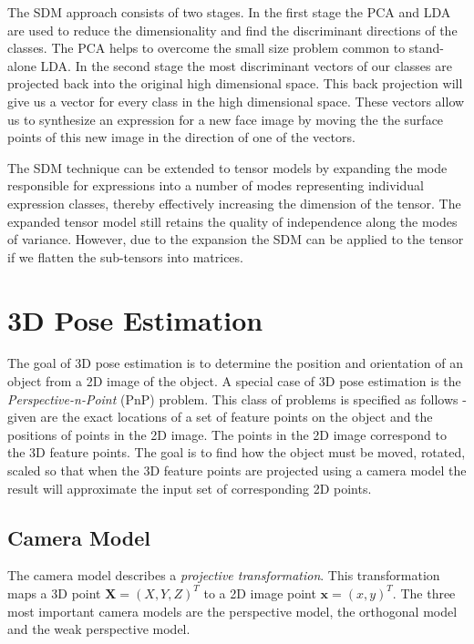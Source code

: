 \documentclass[11pt,a4paper]{report}
\begin{document}
The SDM approach consists of two stages. In the first stage the PCA
and LDA are used to reduce the dimensionality and find the discriminant
directions of the classes. The PCA helps to overcome the small size problem
common to stand-alone LDA. In the second stage the most discriminant vectors of
our classes are projected back into the original high dimensional space. This
back projection will give us a vector for every class in the high dimensional
space. These vectors allow us to synthesize an expression for a new face image by moving the the surface
points of this new image in the direction of one of the vectors. 

The SDM technique can be extended to tensor models by expanding the mode
responsible for expressions into a number of modes representing
individual expression classes, thereby effectively increasing the dimension of
the tensor. The expanded tensor model still retains the quality of independence
along the modes of variance. However, due to the expansion the SDM can be
applied to the tensor if we flatten the sub-tensors into matrices.

\section{3D Pose Estimation}\label{s:3dpose}
The goal of 3D pose estimation is to determine the position and orientation of
an object from a 2D image of the object. A special case of 3D pose estimation is
the \textit{Perspective-n-Point} (PnP) problem. This class of problems is specified as follows -
given are the exact locations of a set of feature points on the object and the
positions of points in the 2D
image. The points in the 2D image correspond to the 3D feature points. The goal
is to find how the object must be moved, rotated, scaled so that when the
3D feature points are projected using a camera model the result will approximate
the input set of corresponding 2D points.  

\subsection{Camera Model}\label{s:camera}
The camera model describes a \textit{projective transformation}. This transformation maps a 3D
point $\mathbf{X} = (X,Y,Z)^T$ to a 2D image point $\mathbf{x} = (x,y)^T$. The
three most important camera models are the perspective model, the orthogonal
model and the weak perspective model.
\end{document}
